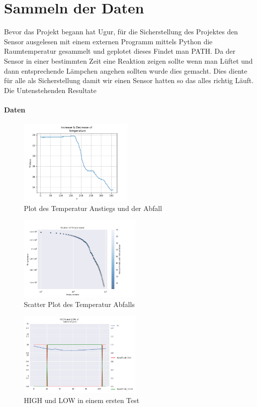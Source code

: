 \documentclass{article}
\begin{document}
\section{Sammeln der Daten}
Bevor das Projekt begann hat Ugur, für die Sicherstellung des Projektes den Sensor  ausgelesen mit einem externen Programm mittels Python die Raumtemperatur gesammelt und geplotet dieses Findet man PATH. Da der Sensor in einer bestimmten Zeit eine Reaktion zeigen sollte wenn man Lüftet und dann entsprechende Lämpchen angehen sollten wurde dies gemacht. Dies diente für alle als Sicherstellung damit wir einen Sensor hatten so das alles richtig Läuft. Die Untenstehenden Resultate  
\paragraph{Daten}
\begin{figure}[!h]
\begin{center}
\includegraphics[width=0.49\textwidth]{plot.png}
\caption{Plot des Temperatur Anstiegs und der Abfall}
\label{fig:decrease}
\end{center}
\end{figure}
\begin{figure}[!h]
\begin{center}
\includegraphics[width=0.53\textwidth]{scatter.png}
\caption{Scatter Plot des Temperatur Abfalls}
\label{fig:scatter}
\end{center}
\end{figure}
\begin{figure}[!h]
\begin{center}
\includegraphics[width=0.53\textwidth]{digitalRead.png}
\caption{HIGH und LOW in einem ersten Test}
\label{fig:highlow}
\end{center}
\end{figure}
\end{document}
